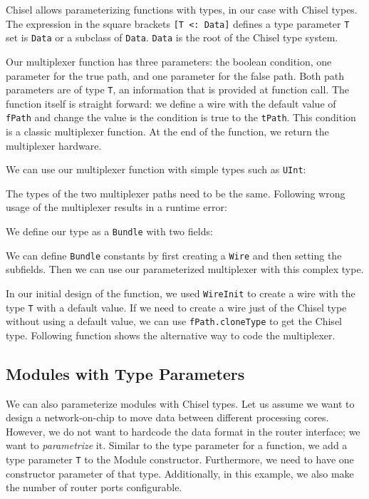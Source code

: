 \documentclass[%
    10pt,
    headinclude, footexclude,
    openright, %
    notitlepage,
    cleardoubleempty,
    headsepline,
    pointlessnumbers,
    bibtotoc, idxtotoc,
    ]{scrbook}
\newcommand{\code}[1]{{\small{\texttt{#1}}}}
\begin{document}

Chisel allows parameterizing functions with types, in our case with Chisel
types. The expression in the square brackets \code{[T <: Data]} defines
a type parameter \code{T} set is \code{Data} or a subclass of \code{Data}.
\code{Data} is the root of the Chisel type system.

Our multiplexer function has three parameters: the boolean condition,
one parameter for the true path, and one parameter for the false path.
Both path parameters are of type \code{T}, an information that is
provided at function call. The function itself is straight forward:
we define a wire with the default value of \code{fPath} and
change the value is the condition is true to the \code{tPath}.
This condition is a classic multiplexer function.
At the end of the function, we return the multiplexer hardware.

We can use our multiplexer function with simple types such as
\code{UInt}:


\noindent The types of the two multiplexer paths need to be the same.
Following wrong usage of the multiplexer results in a runtime error:


\noindent We define our type as a \code{Bundle} with two fields:


\noindent We can define \code{Bundle} constants by first creating
a \code{Wire} and then setting the subfields.
Then we can use our parameterized multiplexer with this complex type.


In our initial design of the function, we used \code{WireInit}
to create a wire with the type \code{T} with a default value.
If we need to create a wire just of the Chisel type without using a default
value, we can use \code{fPath.cloneType} to get the Chisel type.
Following function shows the alternative way to code the multiplexer.


\subsection{Modules with Type Parameters}

We can also parameterize modules with Chisel types.
Let us assume we want to design a network-on-chip to move data between
different processing cores. However, we do not want to hardcode the
data format in the router interface; we want to \emph{parametrize} it.
Similar to the type parameter for a function, we add a type parameter \code{T}
to the Module constructor. Furthermore, we need to have one constructor
parameter of that type. Additionally, in this example, we also make the number
of router ports configurable.
\end{document}
